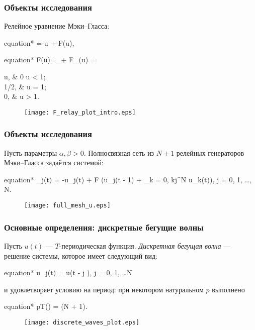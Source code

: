 \begin{frame}
	\frametitle{Объекты исследования}
	
	Релейное уравнение Мэки--Гласса:
	
	\begin{empheq}[box=\myeq]{equation*}
		=-\beta u + \alpha F(u),
	\end{empheq}
	
	\begin{empheq}[box=\myeq]{equation*}
		 F(u)=\lim\limits_{\gamma\to +\infty} F_{\gamma}(u) = 
		\begin{cases}
			u, & 0 \leqslant u < 1;\\
			1/2, & u = 1;\\
			0, & u > 1.
		\end{cases}
	\end{empheq}
	
	\begin{figure}[ht]
		\centering
		\texttt{[image: F\_relay\_plot\_intro.eps]}
	\end{figure}
\end{frame}

\begin{frame}
	\frametitle{Объекты исследования}
	
	Пусть параметры $\alpha, \beta > 0$. Полносвязная сеть из $N + 1$ релейных генераторов Мэки--Гласса задаётся системой:
	
	\small
	\begin{empheq}[box=\myeq]{equation*}
		_j(t) = -\beta u_j(t) + \alpha F \bigg(u_j(t - 1) + \sum\limits_{k = 0, k\neq j}^N u_k(t)\bigg), \quad j = 0, 1, \dots, N.
	\end{empheq}
	\normalsize
	
	\begin{figure}
		\centering
		\texttt{[image: full\_mesh\_u.eps]}
	\end{figure}
	
 \end{frame}

\begin{frame}
	\frametitle{Основные определения: дискретные бегущие волны}
	
	Пусть $u(t)$ --- $T$-периодическая функция. \emph{Дискретная бегущая волна} --- решение системы, которое имеет следующий вид:
	\begin{empheq}[box=\myeq]{equation*}
		u_j(t) = u(t - j \Delta), \quad j = 0, 1, \dots N
	\end{empheq}
	
	и удовлетворяет условию на период: при некотором натуральном $p$ выполнено
	\begin{empheq}[box=\myeq]{equation*}
		pT(\Delta) = \Delta (N + 1).
	\end{empheq}
	
	\begin{figure}
		\centering
		\texttt{[image: discrete\_waves\_plot.eps]}
	\end{figure}
\end{frame}

